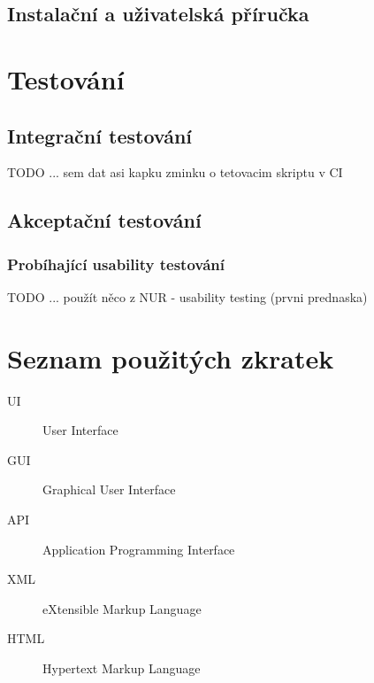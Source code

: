 \documentclass[thesis=M,czech]{FITthesis}[2012/06/26]
\begin{document}
\section{Instalační a uživatelská příručka} \label{sec:impl_prirucka}




\chapter{Testování} \label{chap:testovani}
\section{Integrační testování} \label{sec:testovani_integracni}	
TODO ... sem dat asi kapku zminku o tetovacim skriptu v CI
\section{Akceptační testování} \label{sec:testovani_akceptacni}
\subsection{Probíhající usability testování} \label{subsec:testovani_akceptacni_utest}
TODO ... použít něco z NUR - usability testing (prvni prednaska)

\begin{conclusion}
\end{conclusion}

\nocite{*}



\appendix

\chapter{Seznam použitých zkratek}
\begin{description}
	\item[UI] User Interface
	\item[GUI] Graphical User Interface
	\item[API] Application Programming Interface
	\item[XML] eXtensible Markup Language
	\item[HTML] Hypertext Markup Language
\end{description}
\end{document}
